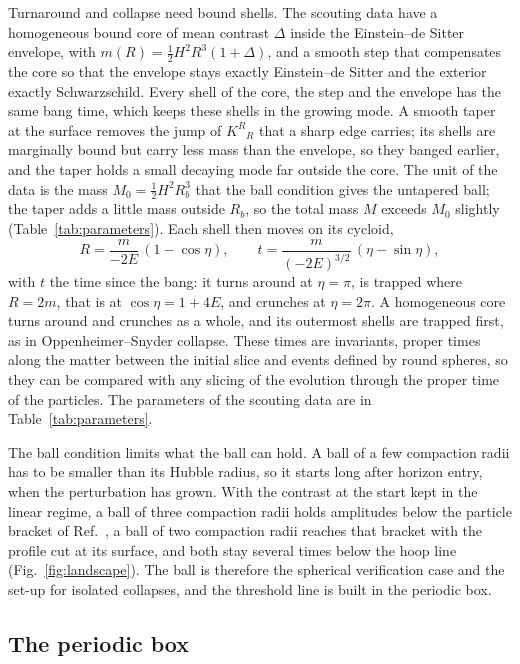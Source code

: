 \documentclass[aps,prd,twocolumn,10pt,superscriptaddress,nofootinbib,longbibliography,floatfix]{revtex4-2}
\begin{document}
Turnaround and collapse need bound shells. The scouting data have a homogeneous bound core of mean contrast $\Delta$ inside the Einstein--de Sitter envelope, with $m(R)=\tfrac12H^2R^3(1+\Delta)$, and a smooth step that compensates the core so that the envelope stays exactly Einstein--de Sitter and the exterior exactly Schwarzschild. Every shell of the core, the step and the envelope has the same bang time, which keeps these shells in the growing mode. A smooth taper at the surface removes the jump of $K^R{}_R$ that a sharp edge carries; its shells are marginally bound but carry less mass than the envelope, so they banged earlier, and the taper holds a small decaying mode far outside the core. The unit of the data is the mass $M_0=\tfrac12H^2R_b^3$ that the ball condition gives the untapered ball; the taper adds a little mass outside $R_b$, so the total mass $M$ exceeds $M_0$ slightly (Table~\ref{tab:parameters}). Each shell then moves on its cycloid,
\begin{equation}\label{eq:cycloid}
R = \frac{m}{-2E}\,(1-\cos\eta),\qquad t = \frac{m}{(-2E)^{3/2}}\,(\eta-\sin\eta),
\end{equation}
with $t$ the time since the bang: it turns around at $\eta=\pi$, is trapped where $R=2m$, that is at $\cos\eta=1+4E$, and crunches at $\eta=2\pi$. A homogeneous core turns around and crunches as a whole, and its outermost shells are trapped first, as in Oppenheimer--Snyder collapse. These times are invariants, proper times along the matter between the initial slice and events defined by round spheres, so they can be compared with any slicing of the evolution through the proper time of the particles. The parameters of the scouting data are in Table~\ref{tab:parameters}.

The ball condition limits what the ball can hold. A ball of a few compaction radii has to be smaller than its Hubble radius, so it starts long after horizon entry, when the perturbation has grown. With the contrast at the start kept in the linear regime, a ball of three compaction radii holds amplitudes below the particle bracket of Ref.~\cite{Yoo:2026mdpbh}, a ball of two compaction radii reaches that bracket with the profile cut at its surface, and both stay several times below the hoop line (Fig.~\ref{fig:landscape}). The ball is therefore the spherical verification case and the set-up for isolated collapses, and the threshold line is built in the periodic box.

\subsection{The periodic box}\label{sec:box}
\end{document}

